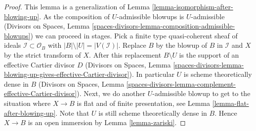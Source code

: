 \documentclass[10pt,a4paper]{amsart}
\theoremstyle{plain}
\theoremstyle{definition}
\theoremstyle{remark}
\numberwithin{equation}{subsection}
\begin{document}
\begin{proof}
This lemma is a generalization of
Lemma \ref{lemma-isomorphism-after-blowing-up}.
As the composition of $U$-admissible blowups is $U$-admissible
(Divisors on Spaces, Lemma
\ref{spaces-divisors-lemma-composition-admissible-blowups})
we can proceed in stages. Pick a finite type quasi-coherent sheaf
of ideals $\mathcal{I} \subset \mathcal{O}_B$ with
$|B| \setminus |U| = |V(\mathcal{I})|$. Replace $B$ by the blowup
of $B$ in $\mathcal{I}$ and $X$ by the strict transform of $X$.
After this replacement $B \setminus U$ is the support of an effective
Cartier divisor $D$ (Divisors on Spaces, Lemma
\ref{spaces-divisors-lemma-blowing-up-gives-effective-Cartier-divisor}).
In particular $U$ is scheme theoretically dense in $B$
(Divisors on Spaces, Lemma
\ref{spaces-divisors-lemma-complement-effective-Cartier-divisor}).
Next, we do another $U$-admissible blowup to get to the situation where
$X \to B$ is flat and of finite presentation, see
Lemma \ref{lemma-flat-after-blowing-up}. Note that $U$ is still scheme
theoretically dense in $B$. Hence $X \to B$ is an open immersion by
Lemma \ref{lemma-zariski}.
\end{proof}
\end{document}
